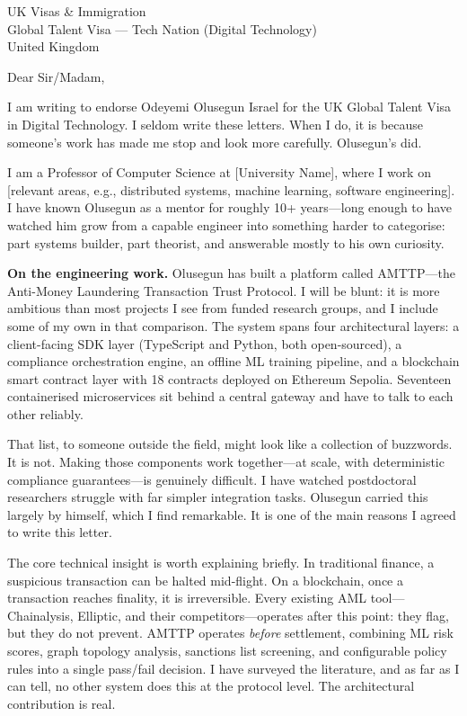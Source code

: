 \documentclass[12pt,a4paper]{letter}
\date{27 February 2026}
\begin{document}
\begin{letter}{UK Visas \& Immigration\\
Global Talent Visa --- Tech Nation (Digital Technology)\\
United Kingdom}

\opening{Dear Sir/Madam,}

I am writing to endorse Odeyemi Olusegun Israel for the UK Global Talent Visa in Digital Technology. I seldom write these letters. When I do, it is because someone's work has made me stop and look more carefully. Olusegun's did.

I am a Professor of Computer Science at {[University Name]}, where I work on {[relevant areas, e.g., distributed systems, machine learning, software engineering]}. I have known Olusegun as a mentor for roughly 10+ years---long enough to have watched him grow from a capable engineer into something harder to categorise: part systems builder, part theorist, and answerable mostly to his own curiosity.

\textbf{On the engineering work.} Olusegun has built a platform called AMTTP---the Anti-Money Laundering Transaction Trust Protocol. I will be blunt: it is more ambitious than most projects I see from funded research groups, and I include some of my own in that comparison. The system spans four architectural layers: a client-facing SDK layer (TypeScript and Python, both open-sourced), a compliance orchestration engine, an offline ML training pipeline, and a blockchain smart contract layer with 18 contracts deployed on Ethereum Sepolia. Seventeen containerised microservices sit behind a central gateway and have to talk to each other reliably.

That list, to someone outside the field, might look like a collection of buzzwords. It is not. Making those components work together---at scale, with deterministic compliance guarantees---is genuinely difficult. I have watched postdoctoral researchers struggle with far simpler integration tasks. Olusegun carried this largely by himself, which I find remarkable. It is one of the main reasons I agreed to write this letter.

The core technical insight is worth explaining briefly. In traditional finance, a suspicious transaction can be halted mid-flight. On a blockchain, once a transaction reaches finality, it is irreversible. Every existing AML tool---Chainalysis, Elliptic, and their competitors---operates after this point: they flag, but they do not prevent. AMTTP operates \textit{before} settlement, combining ML risk scores, graph topology analysis, sanctions list screening, and configurable policy rules into a single pass/fail decision. I have surveyed the literature, and as far as I can tell, no other system does this at the protocol level. The architectural contribution is real.


\end{letter}
\end{document}
